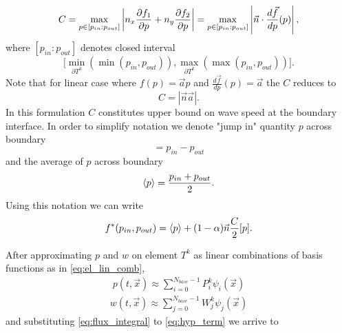 \begin{equation}
	C = \max_{p \in [p_{in} : p_{out}]} \left\lvert n_x \frac{\partial f_1}{\partial p} + n_y \frac{\partial f_2}{\partial p}\right\rvert =
	    \max_{p \in [p_{in} : p_{out}]} \left\lvert\vec{n}\cdot\frac{d\vec{f}}{dp}(p)\right\rvert,
\end{equation}
where $[p_{in} : p_{out}]$ denotes closed interval 
$$\big[\min_{\partial{T^k}} (\min(p_{in}, p_{out})), 
	   \max_{\partial{T^k}}(\max(p_{in}, p_{out}))\big].$$ 
Note that for linear case where $f(p) = \vec{a}p$ and $\frac{d\vec{f}}{dp}(p) = \vec{a}$  
the $C$ reduces to
\begin{equation}
	C = |\vec{n}\vec{a}|.
\end{equation}
In this formulation $C$ constitutes upper bound on wave speed at the boundary interface.
In order to simplify notation we denote "jump in" 
quantity $p$ across boundary 
\begin{equation}
	[p] = p_{in} - p_{out}
\end{equation}
and the average of $p$ across boundary  
\begin{equation}
	\label{eq:avrg}
	\langle p\rangle = \frac{p_{in}+p_{out}}{2}.
\end{equation}
Using this notation we can write
\begin{equation}
	f^*(p_{in}, p_{out}) = \langle p\rangle + (1-\alpha) \vec{n}\frac{C}{2}[p].
\end{equation}



After approximating $p$ and $w$ on element $T^k$ as linear combinations of 
basis functions as in 
\eqref{eq:el_lin_comb},
\begin{align}\label{eq:state_epprox}
	p(t, \vec{x}) \approx \sum\limits_{i=0}^{N_{base}-1} P_i^k\psi_i(\vec{x})
\end{align}
\begin{align}\label{eq:test_approx}
	w(t, \vec{x}) \approx \sum\limits_{j=0}^{N_{base}-1} W_j^k\psi_j(\vec{x})
\end{align}
and substituting \eqref{eq:flux_integral} to \eqref{eq:hyp_term} we arrive to 

